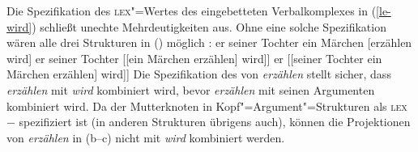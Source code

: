 Die Spezifikation des \textsc{lex}"=Wertes des eingebetteten Verbalkomplexes in (\ref{le-wird})
schließt unechte Mehrdeutigkeiten aus.
Ohne eine solche Spezifikation wären alle drei Strukturen in () möglich \parencites[]{Pollard90a}{HN94b}:
\eal
\ex er seiner Tochter  ein Märchen [erzählen wird]
\ex er seiner Tochter [[ein Märchen erzählen] wird]]\label{pvp-ein-maerchen-erzaehlen}
\ex er [[seiner Tochter ein Märchen erzählen] wird]]
\zl
Die Spezifikation des \lexwes von \emph{erzählen} stellt sicher, dass \emph{erzählen} mit \emph{wird} kombiniert wird,
bevor \emph{erzählen} mit seinen Argumenten kombiniert wird. Da der Mutterknoten in
Kopf"=Argument"=Strukturen als \textsc{lex}$-$ spezifiziert ist (in anderen Strukturen übrigens auch), 
können die Projektionen
von \emph{erzählen} in (b--c) nicht mit \emph{wird} kombiniert werden.

